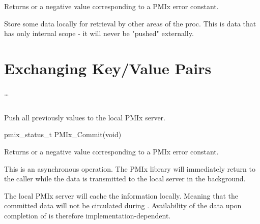 \begin{arglist}
\end{arglist}

Returns  or a negative value corresponding to a PMIx error constant.

\descr

Store some data locally for retrieval by other areas of the proc.
This is data that has only internal scope - it will never be "pushed" externally.


\section{Exchanging Key/Value Pairs}
\label{chap:api_kv_mgmt:exchange}

\ldots

\subsection{}

\summary

Push all previously  values to the local PMIx server.

\format

\cspecificstart
\begin{codepar}
pmix_status_t PMIx_Commit(void)
\end{codepar}
\cspecificend

Returns  or a negative value corresponding to a PMIx error constant.

\descr

This is an asynchronous operation.
The PMIx library will immediately return to the caller while the data is transmitted to the local server in the background.

\adviceuserstart
The local PMIx server will cache the information locally.
Meaning that the committed data will not be circulated during .
Availability of the data upon completion of  is therefore implementation-dependent.
\adviceuserend


\subsection{}

